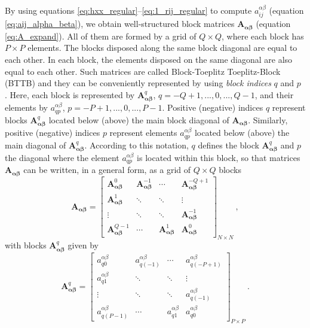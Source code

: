 By using equations \ref{eq:hxx_regular}--\ref{eq:1_rij_regular} to compute 
$a^{\alpha\beta}_{ij}$ (equation \ref{eq:aij_alpha_beta}), we obtain well-structured 
block matrices $\mathbf{A_{\boldsymbol{\alpha\beta}}}$ (equation \ref{eq:A_expand}).
All of them are formed by a grid of $Q \times Q$, where each block has $P \times P$ 
elements. The blocks disposed along the same block diagonal are equal to each other.
In each block, the elements disposed on the same diagonal are also equal to each other.
Such matrices are called Block-Toeplitz Toeplitz-Block (BTTB) and they can be conveniently
represented by using \textit{block indices} $q$ and $p$ \citep{takahashi2020convolutional}.
Here, each block is represented by $\mathbf{A}_{\boldsymbol{\alpha\beta}}^{q}$, 
$q = -Q+1,...,0,..., Q-1$, and their elements by $a^{\alpha\beta}_{qp}$, 
$p = -P+1,...,0,...,P-1$. 
Positive (negative) indices $q$ represent blocks $\mathbf{A}_{\boldsymbol{\alpha\beta}}^{q}$ 
located below (above) the main block diagonal of $\mathbf{A}_{\boldsymbol{\alpha\beta}}$.
Similarly, positive (negative) indices $p$ represent elements $a^{\alpha\beta}_{qp}$ 
located below (above) the main diagonal of $\mathbf{A}_{\boldsymbol{\alpha\beta}}^{q}$.
According to this notation, $q$ defines the block $\mathbf{A}_{\boldsymbol{\alpha\beta}}^{q}$
and $p$ the diagonal where the element $a^{\alpha\beta}_{qp}$ is located within this block, so that
matrices $\mathbf{A_{\boldsymbol{\alpha\beta}}}$ 
can be written, in a general form, as a grid of $Q \times Q$ blocks
\begin{equation}
\mathbf{A}_{\boldsymbol{\alpha\beta}} = \begin{bmatrix}
\mathbf{A}_{\boldsymbol{\alpha\beta}}^{0}   & \mathbf{A}_{\boldsymbol{\alpha\beta}}^{-1} & \cdots          & \mathbf{A}_{\boldsymbol{\alpha\beta}}^{-Q+1} \\
\mathbf{A}_{\boldsymbol{\alpha\beta}}^{1}   & \ddots          & \ddots          & \vdots           \\ 
\vdots           & \ddots          & \ddots          & \mathbf{A}_{\boldsymbol{\alpha\beta}}^{-1}   \\
\mathbf{A}_{\boldsymbol{\alpha\beta}}^{Q-1} & \cdots          & \mathbf{A}_{\boldsymbol{\alpha\beta}}^{1}  & \mathbf{A}_{\boldsymbol{\alpha\beta}}^{0}
\end{bmatrix}_{N \times N} \: ,
\label{eq:BTTB_A_alpha_beta}
\end{equation}
with blocks $\mathbf{A}_{\boldsymbol{\alpha\beta}}^{q}$ given by
\begin{equation}
\mathbf{A}_{\boldsymbol{\alpha\beta}}^{q} = \begin{bmatrix}
a^{\alpha\beta}_{q0}   & a^{\alpha\beta}_{q(-1)} & \cdots  & a^{\alpha\beta}_{q(-P+1)} \\
a^{\alpha\beta}_{q1}   & \ddots     & \ddots  & \vdots       \\ 
\vdots      & \ddots     & \ddots  & a^{\alpha\beta}_{q(-1)}   \\
a^{\alpha\beta}_{q(P-1)} & \cdots     & a^{\alpha\beta}_{q1}  & a^{\alpha\beta}_{q0}
\end{bmatrix}_{P \times P} \: .
\label{eq:Aq_block}
\end{equation}

